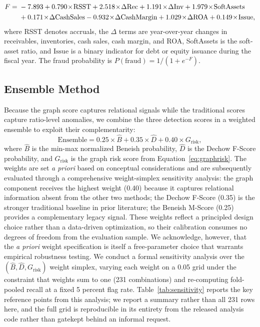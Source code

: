 \documentclass[12pt]{article}
\begin{document}
\begin{align}
    F = \; &-7.893
      + 0.790\!\times\!\mathrm{RSST}
      + 2.518\!\times\!\Delta\mathrm{Rec}
      + 1.191\!\times\!\Delta\mathrm{Inv}
      + 1.979\!\times\!\mathrm{SoftAssets} \notag \\
     &+ 0.171\!\times\!\Delta\mathrm{CashSales}
      - 0.932\!\times\!\Delta\mathrm{CashMargin}
      + 1.029\!\times\!\Delta\mathrm{ROA}
      + 0.149\!\times\!\mathrm{Issue},
\end{align}
where RSST denotes \citet{richardson2005} accruals, the $\Delta$ terms are
year-over-year changes in receivables, inventories, cash sales, cash margin,
and ROA, SoftAssets is the soft-asset ratio, and $\mathrm{Issue}$ is a
binary indicator for debt or equity issuance during the fiscal year.  The
fraud probability is $P(\text{fraud}) = 1/(1 + e^{-F})$.

\subsection*{Ensemble Method}
\label{subsec:ensemble}

Because the graph score captures relational signals while the traditional
scores capture ratio-level anomalies, we combine the three detection scores
in a weighted ensemble to exploit their complementarity:
\begin{equation}
    \text{Ensemble} = 0.25\!\times\!\hat{B}
                    + 0.35\!\times\!\hat{D}
                    + 0.40\!\times\!G_{\text{risk}},
    \label{eq:ensemble}
\end{equation}
where $\hat{B}$ is the min-max normalized Beneish probability, $\hat{D}$ is
the Dechow F-Score probability, and $G_{\text{risk}}$ is the graph risk
score from
Equation~\eqref{eq:graphrisk}.  The weights are set \textit{a priori} based
on conceptual considerations and are subsequently evaluated through a
comprehensive weight-simplex sensitivity analysis: the graph component receives the
highest weight (0.40) because it captures relational information absent from
the other two methods; the Dechow F-Score (0.35) is the stronger traditional
baseline in prior literature; the Beneish M-Score (0.25) provides a
complementary legacy signal.  These weights reflect a principled design
choice rather than a data-driven optimization, so their calibration consumes
no degrees of freedom from the evaluation sample.  We acknowledge, however,
that the \textit{a priori} weight specification is itself a free-parameter
choice that warrants empirical robustness testing.  We conduct a formal
sensitivity analysis over the $(\hat{B}, \hat{D}, G_{\text{risk}})$ weight simplex,
varying each weight on a 0.05 grid under the constraint that weights sum
to one (231 combinations) and re-computing fold-pooled recall at a fixed
5 percent flag rate.  Table~\ref{tab:sensitivity} reports the key reference
points from this analysis; we report a summary rather than all 231 rows
here, and the full grid is reproducible in its entirety from the released
analysis code rather than gatekept behind an informal request.
\end{document}
